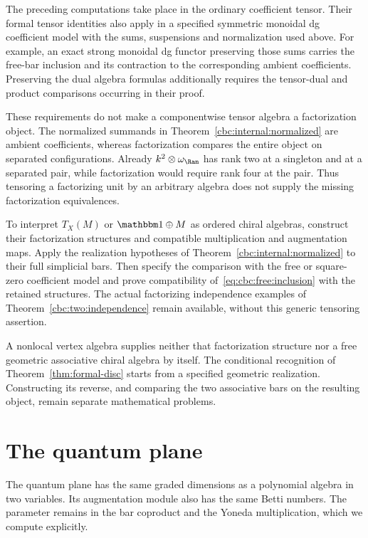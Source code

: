The preceding computations take place in the ordinary coefficient tensor.
Their formal tensor identities also apply in a specified symmetric monoidal dg coefficient model with the sums, suspensions and normalization used above.
For example, an exact strong monoidal dg functor preserving those sums carries the free-bar inclusion and its contraction to the corresponding ambient coefficients.
Preserving the dual algebra formulas additionally requires the tensor-dual and product comparisons occurring in their proof.

These requirements do not make a componentwise tensor algebra a factorization object.
The normalized summands in Theorem~\ref{cbc:internal:normalized} are ambient coefficients, whereas factorization compares the entire object on separated configurations.
Already $k^2\otimes\omega_{\Ran}$ has rank two at a singleton and at a separated pair, while factorization would require rank four at the pair.
Thus tensoring a factorizing unit by an arbitrary algebra does not supply the missing factorization equivalences.

To interpret $T_X(M)$ or $\mathbbm1\oplus M$ as ordered chiral algebras, construct their factorization structures and compatible multiplication and augmentation maps.
Apply the realization hypotheses of Theorem~\ref{cbc:internal:normalized} to their full simplicial bars.
Then specify the comparison with the free or square-zero coefficient model and prove compatibility of~\eqref{eq:cbc:free:inclusion} with the retained structures.
The actual factorizing independence examples of Theorem~\ref{cbc:two:independence} remain available, without this generic tensoring assertion.

A nonlocal vertex algebra supplies neither that factorization structure nor a free geometric associative chiral algebra by itself.
The conditional recognition of Theorem~\ref{thm:formal-disc} starts from a specified geometric realization.
Constructing its reverse, and comparing the two associative bars on the resulting object, remain separate mathematical problems.

\chapter{The quantum plane}\label{chap:cbc:quantum-plane}

The quantum plane has the same graded dimensions as a polynomial algebra in two variables.
Its augmentation module also has the same Betti numbers.
The parameter remains in the bar coproduct and the Yoneda multiplication, which we compute explicitly.

